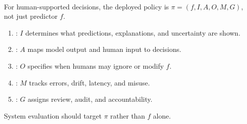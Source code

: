 \begin{remark} \label{rem:sl-human-system-boundary} \\
For human-supported decisions, the deployed policy is $\pi=(f,I,A,O,M,G)$, not just predictor $f$.
\begin{enumerate}[label=(\roman*)]
\setlength{\itemsep}{0pt}
\item {}: $I$ determines what predictions, explanations, and uncertainty are shown.
\item {}: $A$ maps model output and human input to decisions.
\item {}: $O$ specifies when humans may ignore or modify $f$.
\item {}: $M$ tracks errors, drift, latency, and misuse.
\item {}: $G$ assigns review, audit, and accountability.
\end{enumerate}
System evaluation should target $\pi$ rather than $f$ alone.
\end{remark}
